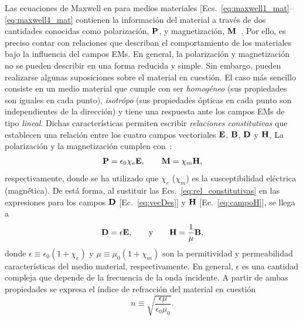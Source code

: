 Las ecuaciones de Maxwell en para medios materiales  [Ecs.~\eqref{eq:maxwell1_mat}--\eqref{eq:maxwell4_mat} contienen la información del material a través de dos cantidades conocidas como polarización, $\vb{P}$, y magnetización, $\vb{M}$~\cite{Griffiths}. Por ello, es preciso contar con relaciones que describan el comportamiento de los materiales bajo la influencia del campos EMs. En general, la polarización y magnetización no se pueden describir en una forma reducida y simple. Sin embargo, pueden realizarse algunas suposiciones sobre el material en cuestión. El caso más sencillo consiste en un medio material que cumple con ser \textit{homogéneo} (sus propiedades son iguales en cada punto), \textit{isotrópo} (sus propiedades ópticas en cada punto son independientes de la dirección) y tiene una respuesta ante los campos EMs de tipo \textit{lineal}. Dichas características permiten escribir \textit{relaciones constitutivas} que establecen una relación entre los cuatro campos vectoriales $\vb{E}$, $\vb{B}$, $\vb{D}$ y $\vb{H}$, La polarización y la magnetización cumplen con~\cite{Griffiths}:
%
\begin{eqnarray}
	\vb{P}=\epsilon_{0}\chi_{e}\vb{E},\qquad \vb{M}=\chi_{m}\vb{H},\label{eq:rel_constitutivas}
\end{eqnarray} 
%
respectivamente, donde se ha utilizado que $\chi_{e}$ ($\chi_{m}$) es la susceptibilidad eléctrica (magnética). De está forma, al sustituir las Ecs.~\eqref{eq:rel_constitutivas} en las expresiones para los campos $\vb{D}$ [Ec.~\eqref{eq:vecDes}] y $\vb{H}$ [Ec.~\eqref{eq:campoH}], se llega a~\cite{Griffiths}
\begin{eqnarray}
	\vb{D}=\epsilon\vb{E}, \qquad \text{y} \qquad
	\vb{H}=\frac{1}{\mu} \vb{B}, \label{eq:hache}
\end{eqnarray}
donde  $\epsilon\equiv\epsilon_{0}\left(1+\chi_{e}\right)$ y $\mu\equiv\mu_{0}\left(1+\chi_{m}\right)$ son la permitividad y permeabilidad características del medio material, respectivamente. En general, $\epsilon$ es una cantidad compleja que depende de la frecuencia de la onda incidente. A partir de ambas propiedades se expresa el índice de refracción del material en cuestión~\cite{Griffiths}
%
\begin{equation}
	n\equiv\sqrt{\frac{\epsilon\mu}{\epsilon_{0}\mu_{0}}}.
\end{equation}

